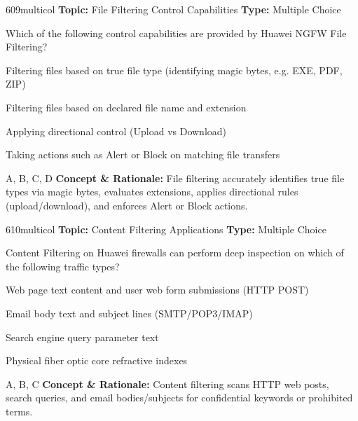 \begin{qcard}{609}{multicol}
\textcolor{darkslate!75}{\small\textbf{Topic:} File Filtering Control Capabilities \hfill \textbf{Type:} Multiple Choice}\vspace{0.4em}\par
Which of the following control capabilities are provided by Huawei NGFW File Filtering?
\begin{qoptions}
\item Filtering files based on true file type (identifying magic bytes, e.g. EXE, PDF, ZIP)
\item Filtering files based on declared file name and extension
\item Applying directional control (Upload vs Download)
\item Taking actions such as Alert or Block on matching file transfers
\end{qoptions}
\end{qcard}
\nopagebreak
\begin{explainbox}{A, B, C, D}
\textbf{Concept \& Rationale:} File filtering accurately identifies true file types via magic bytes, evaluates extensions, applies directional rules (upload/download), and enforces Alert or Block actions.
\end{explainbox}

\begin{qcard}{610}{multicol}
\textcolor{darkslate!75}{\small\textbf{Topic:} Content Filtering Applications \hfill \textbf{Type:} Multiple Choice}\vspace{0.4em}\par
Content Filtering on Huawei firewalls can perform deep inspection on which of the following traffic types?
\begin{qoptions}
\item Web page text content and user web form submissions (HTTP POST)
\item Email body text and subject lines (SMTP/POP3/IMAP)
\item Search engine query parameter text
\item Physical fiber optic core refractive indexes
\end{qoptions}
\end{qcard}
\nopagebreak
\begin{explainbox}{A, B, C}
\textbf{Concept \& Rationale:} Content filtering scans HTTP web posts, search queries, and email bodies/subjects for confidential keywords or prohibited terms.
\end{explainbox}

